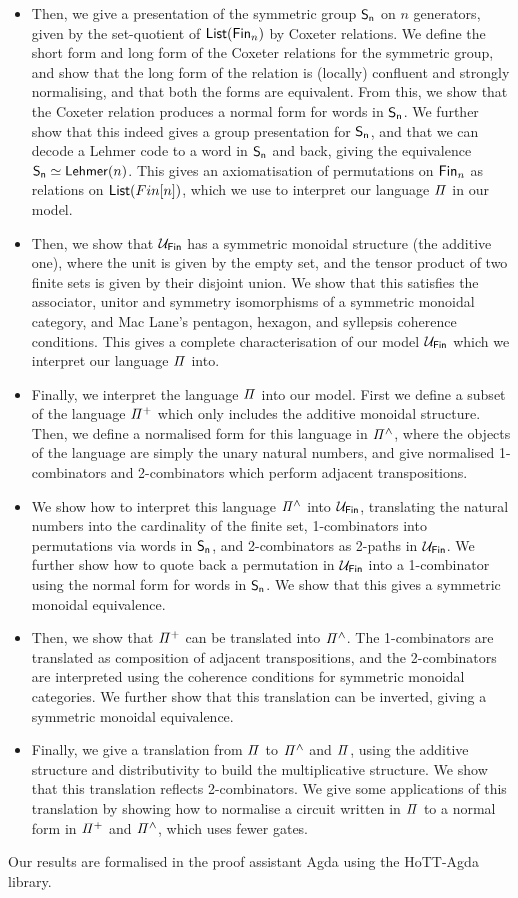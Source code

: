 \begin{itemize}
\item Then, we give a presentation of the symmetric group $\Sn[n]$ on $n$ generators, given by the set-quotient of $\List[\Fin[n]]$ by Coxeter relations. We define the short form and long form of the Coxeter relations for the symmetric group, and show that the long form of the relation is (locally) confluent and strongly normalising, and that both the forms are equivalent. From this, we show that the Coxeter relation produces a normal form for words in $\Sn$. We further show that this indeed gives a group presentation for $\Sn$, and that we can decode a Lehmer code to a word in $\Sn[n]$ and back, giving the equivalence $\Sn[n] \eqv \Lehmer[n]$. This gives an axiomatisation of permutations on $\Fin[n]$ as relations on $\List[Fin[n]]$, which we use to interpret our language $\mathit{\Pi}$ in our model.
\item Then, we show that $\UFin$ has a symmetric monoidal structure (the additive one), where the unit is given by the empty set, and the tensor product of two finite sets is given by their disjoint union. We show that this satisfies the associator, unitor and symmetry isomorphisms of a symmetric monoidal category, and Mac Lane's pentagon, hexagon, and syllepsis coherence conditions. This gives a complete characterisation of our model $\UFin$ which we interpret our language $\mathit{\Pi}$ into.
\item Finally, we interpret the language $\mathit{\Pi}$ into our model. First we define a subset of the language $\mathit{{\Pi}^{+}}$ which only includes the additive monoidal structure. Then, we define a normalised form for this language in $\mathit{{\Pi}^{\wedge}}$, where the objects of the language are simply the unary natural numbers, and give normalised 1-combinators and 2-combinators which perform adjacent transpositions.
\item We show how to interpret this language $\mathit{{\Pi}^{\wedge}}$ into $\UFin$, translating the natural numbers into the cardinality of the finite set, 1-combinators into permutations via words in $\Sn$, and 2-combinators as 2-paths in $\UFin$. We further show how to quote back a permutation in $\UFin$ into a 1-combinator using the normal form for words in $\Sn$. We show that this gives a symmetric monoidal equivalence.
\item Then, we show that $\mathit{{\Pi}^{+}}$ can be translated into $\mathit{{\Pi}^{\wedge}}$. The 1-combinators are translated as composition of adjacent transpositions, and the 2-combinators are interpreted using the coherence conditions for symmetric monoidal categories. We further show that this translation can be inverted, giving a symmetric monoidal equivalence.
\item Finally, we give a translation from $\mathit{\Pi}$ to $\mathit{{\Pi}^{\wedge}}$ and $\mathit{\Pi}$, using the additive structure and distributivity to build the multiplicative structure. We show that this translation reflects 2-combinators. We give some applications of this translation by showing how to normalise a circuit written in $\mathit{\Pi}$ to a normal form in $\mathit{{\Pi}^{+}}$ and $\mathit{{\Pi}^{\wedge}}$, which uses fewer gates.
\end{itemize}

Our results are formalised in the proof assistant Agda using the HoTT-Agda library.



